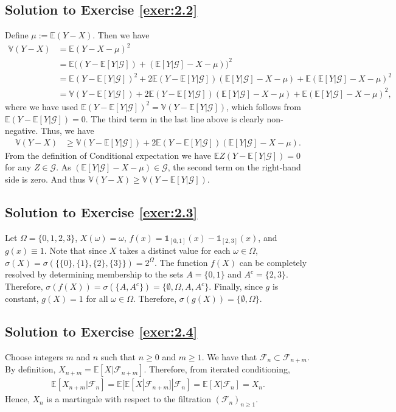 \documentclass[12pt]{book}
\numberwithin{equation}{chapter}
\theoremstyle{plain}
\numberwithin{theorem}{section}
\theoremstyle{definition}
\numberwithin{exercise}{chapter}
\newcommand{\<}{\langle}
\renewcommand{\>}{\rangle}
\renewcommand{\(}{\left(}
\renewcommand{\)}{\right)}
\renewcommand{\[}{\left[}
\renewcommand{\]}{\right]}
\newcommand\Eb{\mathds{E}}
\newcommand\Ib{\mathds{1}} 	%
\newcommand\Vb{\mathds{V}}
\newcommand\Fc{\mathscr{F}}
\newcommand\Gc{\mathscr{G}}
\newcommand\om{\omega}
\newcommand\sig{\sigma}
\begin{document}
\subsection*{Solution to Exercise \ref{exer:2.2}}
Define $\mu := \Eb(Y-X)$.  Then we have
\begin{align}
\Vb (Y-X)
	&=	\Eb (Y-X-\mu)^2 \\
	&=	\Eb \Big( (Y - \Eb[Y|\Gc]) + (\Eb[Y|\Gc]-X-\mu) \Big)^2 \\
	&=	\Eb (Y - \Eb[Y|\Gc])^2 + 2 \Eb (Y - \Eb[Y|\Gc])(\Eb[Y|\Gc]-X-\mu) + \Eb (\Eb[Y|\Gc]-X-\mu)^2 \\
	&=	\Vb (Y - \Eb[Y|\Gc]) + 2 \Eb (Y - \Eb[Y|\Gc])(\Eb[Y|\Gc]-X-\mu) + \Eb (\Eb[Y|\Gc]-X-\mu)^2 ,
\end{align}
where we have used $\Eb (Y - \Eb[Y|\Gc])^2 = \Vb (Y - \Eb[Y|\Gc])$, which follows from $\Eb(Y - \Eb[Y|\Gc])=0$.  The third term in the last line above is clearly non-negative.  Thus, we have
\begin{align}
\Vb (Y-X)
	&\geq	\Vb (Y - \Eb[Y|\Gc]) + 2 \Eb (Y - \Eb[Y|\Gc])(\Eb[Y|\Gc]-X-\mu) .
\end{align}
From the definition of Conditional expectation we have $\Eb Z(Y - \Eb[Y|\Gc])=0$ for any $Z \in \Gc$.  As $(\Eb[Y|\Gc]-X-\mu) \in \Gc$, the second term on the right-hand side is zero.  And thus $\Vb (Y-X) \geq	\Vb (Y - \Eb[Y|\Gc])$.

\subsection*{Solution to Exercise \ref{exer:2.3}}
Let $\Omega = \{ 0, 1, 2, 3\}$,  $X(\om) = \om$, $f(x) = \Ib_{[0,1]}(x) - \Ib_{[2,3]}(x)$, and $g(x) \equiv 1$. Note that since $X$ takes 
a distinct value for each $\omega \in \Omega$, $\sig (X) = \sig( \{ \{0 \}, \{1 \}, \{ 2 \}, \{ 3 \} \}) =  2^\Omega$. 
The function $f(X)$ can be completely resolved by determining membership to the sets $A = \{ 0,1\}$ and $A^c = \{ 
2,3\}$. Therefore, $\sig(f(X)) = \sig( \{ A, A^c \} ) = \{ \emptyset, \Omega, A, A^c \}$. Finally, since $g$ is 
constant, $g ( X) = 1$ for all $\omega \in \Omega$. Therefore, $\sig(g(X)) = \{ \emptyset, \Omega \}$. 

\subsection*{Solution to Exercise \ref{exer:2.4}}
Choose integers $m$ and $n$ such that $n \geq 0$ and $m \geq 1$. We have that $\Fc_n \subset \Fc_{n+m}$. By definition, 
$X_{n+m} = \Eb[ X |\Fc_{n+m}]$. Therefore, from iterated conditioning,
\begin{align}
\Eb[ X_{n+m} | \Fc_n]
	= \Eb[ \Eb[ X | \Fc_{n+m} ] | \Fc_n]
	= \Eb[ X | \Fc_n]
	= X_n.
\end{align}
Hence, $X_n$ is a martingale with respect to the filtration $(\Fc_n)_{n \geq 1}$.
\end{document}
